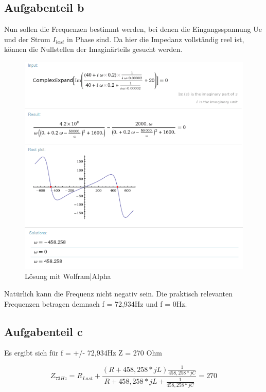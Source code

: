 \documentclass[%
  a4paper, %
  12pt, %
   article, %
  titlepage
]{scrartcl}
\begin{document}
\clearpage

\subsection{Aufgabenteil b}
Nun sollen die Frequenzen bestimmt werden, bei denen die Eingangsspannung Ue
und der Strom $I_{last}$ in Phase sind. Da hier die Impedanz vollständig reel ist, können die Nullstellen der Imaginärteils gesucht werden.

\begin{figure}[h]
\includegraphics[width=\textwidth]{wolfram3.png}
\caption{Lösung mit Wolfram|Alpha}
\label{fig5}
\end{figure}

Natürlich kann die Frequenz nicht negativ sein. Die praktisch relevanten Frequenzen betragen demnach f = 72,934Hz und f = 0Hz.

\clearpage


\subsection{Aufgabenteil c}

Es ergibt sich für f = +/- 72,934Hz Z = 270 Ohm

\begin{equation}
Z_{73Hz}=R_{Last}+\frac{(R+458,258*j L)\frac{1}{458,258*j C}}{R+458,258*j L+\frac{1}{458,258*j C}} = 270
\end{equation}
\end{document}
